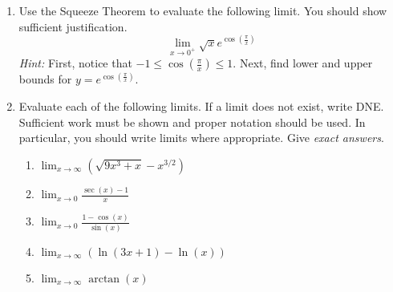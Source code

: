 \documentclass[11pt]{article}
\theoremstyle{definition}
\theoremstyle{definition}
\newcommand{\ds}{\displaystyle}
\begin{document}
\begin{enumerate}

\item Use the Squeeze Theorem to evaluate the following limit.  You should show sufficient justification.
\[
\lim_{x\to 0^+}\sqrt{x}e^{\cos\left(\frac{\pi}{x}\right)}
\]
\emph{Hint:} First, notice that $-1\leq \cos\left(\frac{\pi}{x}\right)\leq 1$.  Next, find lower and upper bounds for $y=e^{\cos\left(\frac{\pi}{x}\right)}$.

\item Evaluate each of the following limits.  If a limit does not exist, write DNE.  Sufficient work must be shown and proper notation should be used.  In particular, you should write limits where appropriate.  Give \emph{exact answers}.

\begin{enumerate}

\item $\displaystyle \lim_{x\to \infty}\left(\sqrt{9x^3+x}-x^{3/2}\right)$


\item $\displaystyle{\lim_{x\rightarrow 0} \frac{\sec(x)-1}{x}}$

\item $\displaystyle{\lim_{x\rightarrow 0} \frac{1-\cos(x)}{\sin(x)}}$

%
%

\item $\displaystyle \lim_{x\to \infty} \left(\ln(3x+1)-\ln(x)\right)$

\item $\ds \lim_{x \to \infty}\arctan(x)$


\end{enumerate}
\end{enumerate}
\end{document}
